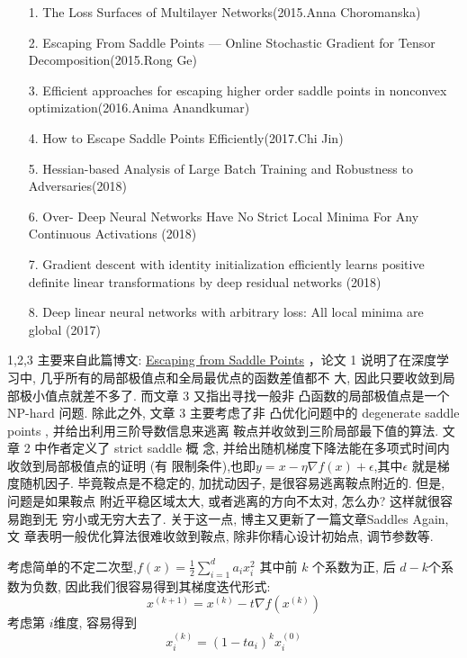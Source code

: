 \documentclass[UTF8]{ctexart}
\begin{document}
\begin{itemize}
	\item[1.] The Loss Surfaces of Multilayer Networks(2015.Anna Choromanska) \label{all not diff}
	\item[2.]  Escaping From Saddle Points — Online Stochastic Gradient for Tensor
	Decomposition(2015.Rong Ge)
	\item[3.] Efficient approaches for escaping higher order saddle points in 
	nonconvex optimization(2016.Anima Anandkumar)
	\item[4.]  How to Escape Saddle Points Efficiently(2017.Chi Jin)
	\item[5.]  Hessian-based Analysis of Large Batch Training and Robustness to
	Adversaries(2018)
	\item[6.] Over- Deep Neural Networks Have No Strict Local Minima For Any
	Continuous Activations (2018)
	\item[7.] Gradient descent with identity initialization efficiently learns positive
	definite linear transformations by deep residual networks (2018)
	\item[8.] Deep linear neural networks with arbitrary loss: All local minima are
	global (2017)
	
\end{itemize}

1,2,3 主要来自此篇博文:
\href{http://www.offconvex.org/2016/03/22/saddlepoints/}{Escaping from Saddle Points}
，论文 1 说明了在深度学习中, 几乎所有的局部极值点和全局最优点的函数差值都不
大, 因此只要收敛到局部极小值点就差不多了. 而文章 3 又指出寻找一般非
凸函数的局部极值点是一个 NP-hard 问题. 除此之外, 文章 3 主要考虑了非
凸优化问题中的 degenerate saddle points , 并给出利用三阶导数信息来逃离
鞍点并收敛到三阶局部最下值的算法. 文章 2 中作者定义了 strict saddle 概
念, 并给出随机梯度下降法能在多项式时间内收敛到局部极值点的证明 (有
限制条件),也即$y=x-\eta \nabla f(x)+\epsilon$,其中$\epsilon$ 就是梯度随机因子.
毕竟鞍点是不稳定的, 加扰动因子, 是很容易逃离鞍点附近的. 但是, 问题是如果鞍点
附近平稳区域太大, 或者逃离的方向不太对, 怎么办? 这样就很容易跑到无
穷小或无穷大去了. 关于这一点, 博主又更新了一篇文章Saddles Again, 文
章表明一般优化算法很难收敛到鞍点, 除非你精心设计初始点, 调节参数等.

考虑简单的不定二次型,$f(x)=\frac{1}{2} \sum_{i=1}^{d} a_{i} x_{i}^{2}$
其中前 $k$ 个系数为正, 后
$d − k $个系数为负数, 因此我们很容易得到其梯度迭代形式:
$$x^{(k+1)}=x^{(k)}-t \nabla f\left(x^{(k)}\right)$$
考虑第 $i $维度, 容易得到
$$x_{i}^{(k)}=\left(1-t a_{i}\right)^{k} x_{i}^{(0)}$$
\end{document}

